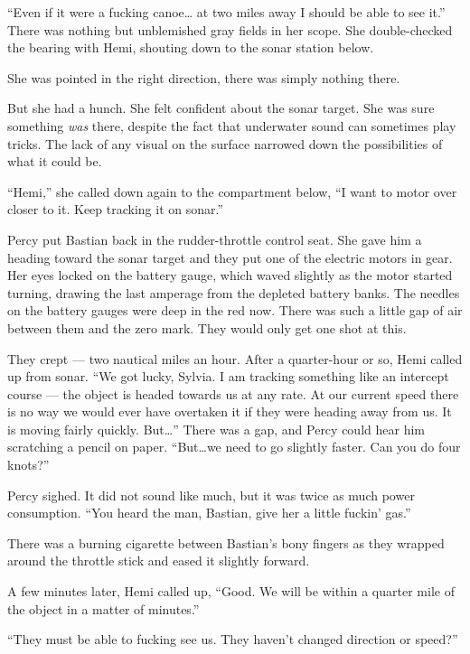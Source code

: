 \documentclass[
]{scrbook}
\begin{document}
``Even if it were a fucking canoe\ldots{} at two miles away I should be
able to see it.'' There was nothing but unblemished gray fields in her
scope. She double-checked the bearing with Hemi, shouting down to the
sonar station below.

She was pointed in the right direction, there was simply nothing there.

But she had a hunch. She felt confident about the sonar target. She was
sure something \emph{was} there, despite the fact that underwater sound
can sometimes play tricks. The lack of any visual on the surface
narrowed down the possibilities of what it could be.

``Hemi,'' she called down again to the compartment below, ``I want to
motor over closer to it. Keep tracking it on sonar.''

Percy put Bastian back in the rudder-throttle control seat. She gave him
a heading toward the sonar target and they put one of the electric
motors in gear. Her eyes locked on the battery gauge, which waved
slightly as the motor started turning, drawing the last amperage from
the depleted battery banks. The needles on the battery gauges were deep
in the red now. There was such a little gap of air between them and the
zero mark. They would only get one shot at this.

\bigskip

They crept --- two nautical miles an hour. After a quarter-hour or so,
Hemi called up from sonar. ``We got lucky, Sylvia. I am tracking
something like an intercept course --- the object is headed towards us
at any rate. At our current speed there is no way we would ever have
overtaken it if they were heading away from us. It is moving fairly
quickly. But\ldots{}'' There was a gap, and Percy could hear him
scratching a pencil on paper. ``But\ldots we need to go slightly faster.
Can you do four knots?''

Percy sighed. It did not sound like much, but it was twice as much power
consumption. ``You heard the man, Bastian, give her a little fuckin'
gas.''

There was a burning cigarette between Bastian's bony fingers as they
wrapped around the throttle stick and eased it slightly forward.

A few minutes later, Hemi called up, ``Good. We will be within a quarter
mile of the object in a matter of minutes.''

``They must be able to fucking see us. They haven't changed direction or
speed?''
\end{document}
